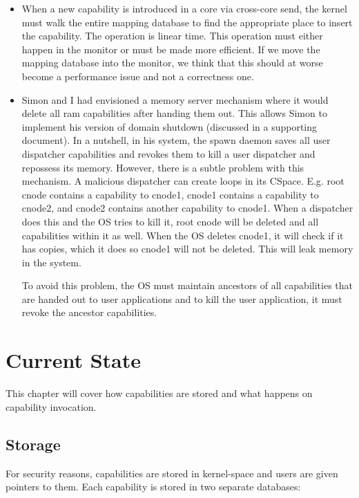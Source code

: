 \documentclass[a4paper,twoside]{report} %
\begin{document}
\begin{itemize}
\item When a new capability is introduced in a core via cross-core
  send, the kernel must walk the entire mapping database to find the
  appropriate place to insert the capability. The operation is linear
  time. This operation must either happen in the monitor or must be
  made more efficient. If we move the mapping database into the
  monitor, we think that this should at worse become a performance
  issue and not a correctness one.

\item Simon and I had envisioned a memory server mechanism where it
  would delete all ram capabilities after handing them out. This
  allows Simon to implement his version of domain shutdown (discussed
  in a supporting document). In a nutshell, in his system, the spawn
  daemon saves all user dispatcher capabilities and revokes them to
  kill a user dispatcher and repossess its memory. However, there is a
  subtle problem with this mechanism. A malicious dispatcher can
  create loops in its CSpace. E.g. root cnode contains a capability to
  cnode1, cnode1 contains a capability to cnode2, and cnode2 contains
  another capability to cnode1. When a dispatcher does this and the OS
  tries to kill it, root cnode will be deleted and all capabilities
  within it as well. When the OS deletes cnode1, it will check if it
  has copies, which it does so cnode1 will not be deleted. This will
  leak memory in the system.

  To avoid this problem, the OS must maintain ancestors of all
  capabilities that are handed out to user applications and to kill
  the user application, it must revoke the ancestor capabilities.
\end{itemize}




\chapter{Current State}\label{chap:current_state}

This chapter will cover how capabilities are stored and what happens
on capability invocation.

\section{Storage}
For security reasons, capabilities are stored in kernel-space and
users are given pointers to them. Each capability is stored in two
separate databases:
\end{document}
